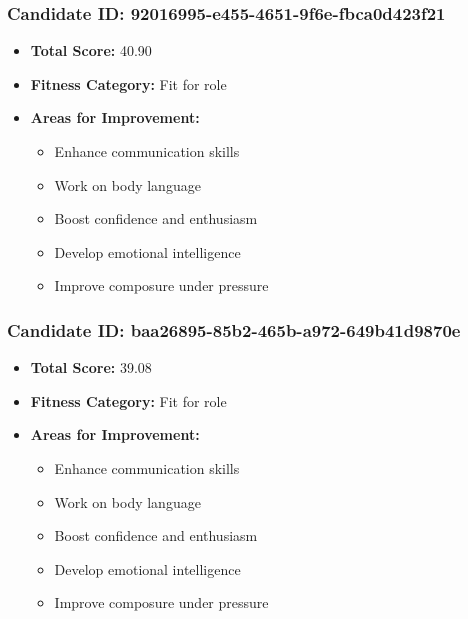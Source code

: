 \documentclass{article}
\begin{document}
\subsubsection{Candidate ID: 92016995-e455-4651-9f6e-fbca0d423f21}
\begin{itemize}
    \item \textbf{Total Score:} 40.90
    \item \textbf{Fitness Category:} Fit for role
    \item \textbf{Areas for Improvement:}
    \begin{itemize}
        \item Enhance communication skills
        \item Work on body language
        \item Boost confidence and enthusiasm
        \item Develop emotional intelligence
        \item Improve composure under pressure
    \end{itemize}
\end{itemize}

\subsubsection{Candidate ID: baa26895-85b2-465b-a972-649b41d9870e}
\begin{itemize}
    \item \textbf{Total Score:} 39.08
    \item \textbf{Fitness Category:} Fit for role
    \item \textbf{Areas for Improvement:}
    \begin{itemize}
        \item Enhance communication skills
        \item Work on body language
        \item Boost confidence and enthusiasm
        \item Develop emotional intelligence
        \item Improve composure under pressure
    \end{itemize}
\end{itemize}
\end{document}
